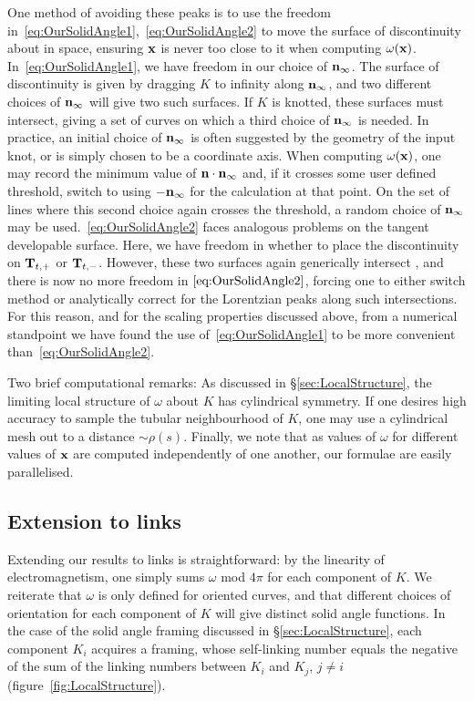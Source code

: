     One method of avoiding these peaks is to use the freedom in~\eqref{eq:OurSolidAngle1},~\eqref{eq:OurSolidAngle2} to move the surface of discontinuity about in space, ensuring ${\bf x}$ is never too close to it when computing $\omega({\bf x})$. In~\eqref{eq:OurSolidAngle1}, we have freedom in our choice of ${\bf n}_\infty$. The surface of discontinuity is given by dragging $K$ to infinity along ${\bf n}_\infty$, and two different choices of ${\bf n}_\infty$ will give two such surfaces. If $K$ is knotted, these surfaces must intersect, giving a set of curves on which a third choice of ${\bf n}_\infty$ is needed. In practice, an initial choice of ${\bf n}_\infty$ is often suggested by the geometry of the input knot, or is simply chosen to be a coordinate axis. When computing $\omega({\bf x})$, one may record the minimum value of ${\bf n}\cdot {\bf n}_\infty$ and, if it crosses some user defined threshold, switch to using $-{\bf n}_\infty$ for the calculation at that point. On the set of lines where this second choice again crosses the threshold, a random choice of ${\bf n}_\infty$ may be used.~\eqref{eq:OurSolidAngle2} faces analogous problems on the tangent developable surface. Here, we have freedom in whether to place the discontinuity on ${\bf T}_{t,+}$ or ${\bf T}_{t,-}$. However, these two surfaces again generically intersect \citep{Cleave1980,Mond1989}, and there is now no more freedom in $\eqref{eq:OurSolidAngle2}$, forcing one to either switch method or analytically correct for the Lorentzian peaks along such intersections. For this reason, and for the scaling properties discussed above, from a numerical standpoint we have found the use of~\eqref{eq:OurSolidAngle1} to be more convenient than~\eqref{eq:OurSolidAngle2}. 

    Two brief computational remarks: As discussed in \S\ref{sec:LocalStructure}, the limiting local structure of $\omega$ about $K$ has cylindrical symmetry. If one desires high accuracy to sample the tubular neighbourhood of $K$, one may use a cylindrical mesh out to a distance ${\sim}\rho(s)$. Finally, we note that as values of $\omega$ for different values of $\bf x$ are computed independently of one another, our formulae are easily parallelised. 

    \subsection{Extension to links}
    Extending our results to links is straightforward: by the linearity of electromagnetism, one simply sums $\omega$ mod $4 \pi$ for each component of $K$. We reiterate that $\omega$ is only defined for oriented curves, and that different choices of orientation for each component of $K$ will give distinct solid angle functions. In the case of the solid angle framing discussed in \S\ref{sec:LocalStructure}, each component $K_i$ acquires a framing, whose self-linking number equals the negative of the sum of the linking numbers between $K_i$ and $K_j$, $j \neq i$ (figure~\ref{fig:LocalStructure}).

